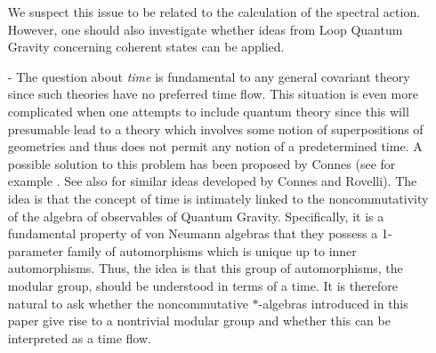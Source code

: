 \documentclass[12pt]{article}
\begin{document}
\begin{itemize}
We suspect this issue to be related to the calculation of the spectral action. However, one should also investigate whether ideas from Loop Quantum Gravity concerning coherent states \cite{Thiemann:2002vj} can be applied. 
\item[-]
The question about {\it time} is fundamental to any general covariant theory since such theories have no preferred time flow. This situation is even more complicated when one attempts to include quantum theory since this will presumable lead to a theory which involves some notion of superpositions of geometries and thus does not permit any notion of a predetermined time. A possible solution to this problem has been proposed by Connes (see for example \cite{Connes:2000ti}. See also \cite{Connes:1994hv} for similar ideas developed by Connes and Rovelli). The idea is that the concept of time is intimately linked to the noncommutativity of the algebra of observables of Quantum Gravity. Specifically, it is a fundamental property of von Neumann algebras that they possess a 1-parameter family of automorphisms which is unique up to inner automorphisms. Thus, the idea is that this group of automorphisms, the modular group, should be understood in terms of a time. It is therefore natural to ask whether the noncommutative ${\ast}$-algebras introduced in this paper give rise to a nontrivial modular group and whether this can be interpreted as a time flow. 


\end{itemize}
\end{document}
